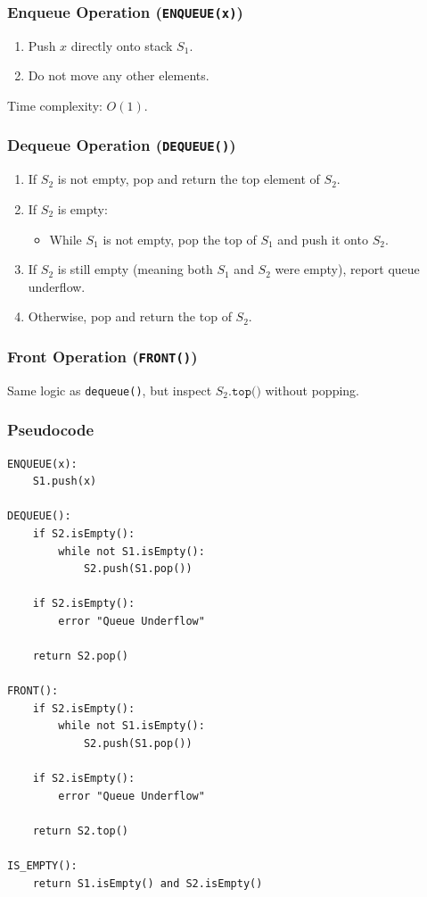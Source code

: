 \subsubsection{Enqueue Operation (\texttt{ENQUEUE(x)})}
\begin{enumerate}
    \item Push $x$ directly onto stack $S_1$.
    \item Do not move any other elements.
\end{enumerate}
Time complexity: $O(1)$.

\subsubsection{Dequeue Operation (\texttt{DEQUEUE()})}
\begin{enumerate}
    \item If $S_2$ is not empty, pop and return the top element of $S_2$.
    \item If $S_2$ is empty:
    \begin{itemize}
        \item While $S_1$ is not empty, pop the top of $S_1$ and push it onto $S_2$.
    \end{itemize}
    \item If $S_2$ is still empty (meaning both $S_1$ and $S_2$ were empty), report queue underflow.
    \item Otherwise, pop and return the top of $S_2$.
\end{enumerate}

\subsubsection{Front Operation (\texttt{FRONT()})}
Same logic as \texttt{dequeue()}, but inspect $S_2.\texttt{top()}$ without popping.

\subsubsection{Pseudocode}

\begin{lstlisting}[style=pseudocode]
ENQUEUE(x):
    S1.push(x)

DEQUEUE():
    if S2.isEmpty():
        while not S1.isEmpty():
            S2.push(S1.pop())
    
    if S2.isEmpty():
        error "Queue Underflow"
    
    return S2.pop()

FRONT():
    if S2.isEmpty():
        while not S1.isEmpty():
            S2.push(S1.pop())
            
    if S2.isEmpty():
        error "Queue Underflow"
        
    return S2.top()

IS_EMPTY():
    return S1.isEmpty() and S2.isEmpty()
\end{lstlisting}

